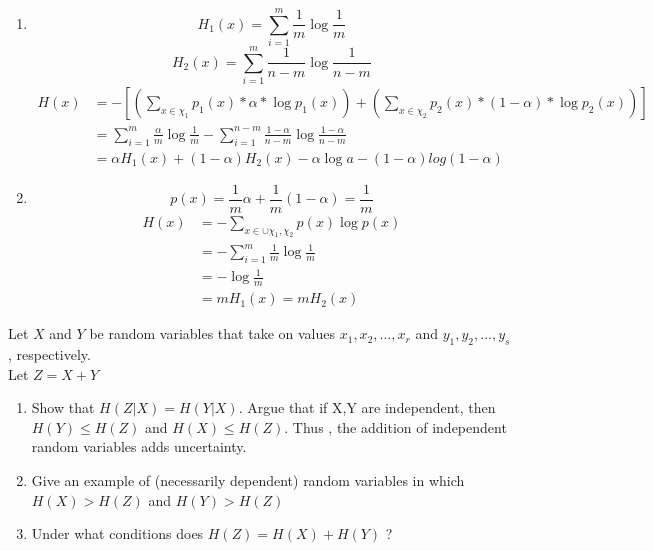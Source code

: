 \documentclass[12pt]{article}
\newenvironment{solution}[2][Solution]{\begin{trivlist}
\item[\hskip \labelsep {\bfseries #1}]}{\end{trivlist}}
\newenvironment{problem}[2][Problem]{\begin{trivlist}
\item[\hskip \labelsep {\bfseries #1}\hskip \labelsep {\bfseries #2.}]}{\end{trivlist}}
\begin{document}
\begin{solution}{}
    \begin{enumerate}[label =(\arabic*)]
    \item 
        \begin{equation*}
        H_{1}(x) = \sum_{i=1}^m\frac{1}{m}\log\frac{1}{m}
        \end{equation*}
        \begin{equation*}
        H_{2}(x) = \sum_{i=1}^m\frac{1}{n-m}\log\frac{1}{n-m}
        \end{equation*}
        \begin{align*}
            H(x) &= -[(\sum_{x\in\chi_{1}}p_{1}(x)*\alpha*\log p_{1}(x)) + 
            (\sum_{x\in\chi_{2}}p_{2}(x)*(1-\alpha)*\log p_{2}(x))] \\
                 &= \sum_{i=1}^m\frac{\alpha}{m}\log\frac{1}{m} - 
                 \sum_{i=1}^{n-m}\frac{1 - \alpha}{n-m}\log\frac{1 - \alpha}{n-m} \\
                 &= \alpha H_{1}(x) + (1-\alpha)H_{2}(x) - \alpha\log a - (1-\alpha)log(1-\alpha)
        \end{align*}
    \item
        \begin{equation*}
        p(x) = \frac{1}{m}\alpha + \frac{1}{m}(1-\alpha) = \frac{1}{m}
        \end{equation*}
        \begin{align*}
            H(x) &= -\sum_{x\in\cup{\chi_{1},\chi_{2}}} p(x)\log p(x) \\
                &= -\sum_{i=1}^m\frac{1}{m}\log\frac{1}{m} \\
                &= -\log\frac{1}{m} \\
                &= m H_{1}(x) = m H_{2}(x)
        \end{align*}
    \end{enumerate}
\end{solution}

\begin{problem}{3 Entropy of a sum}
    \item 
        Let $X$ and $Y$ be random variables that take on values $x_{1},x_{2},...,x_{r}$ and $y_1,y_2,...,y_s$, respectively.\\Let $Z=X+Y$
    \begin{enumerate}[label =(\alph*)]
    \item
        Show that $H(Z|X)=H(Y|X)$. Argue that if X,Y are independent, then $H(Y)\leq H(Z)$ and  $H(X)\leq H(Z)$. Thus , the addition of independent random variables adds uncertainty.
    \item
        Give an example of (necessarily dependent) random variables in which $H(X)>H(Z)$ and $H(Y)>H(Z)$
    \item
        Under what conditions does $H(Z)=H(X)+H(Y)$ ?
    \end{enumerate}
\end{problem}
\end{document}
